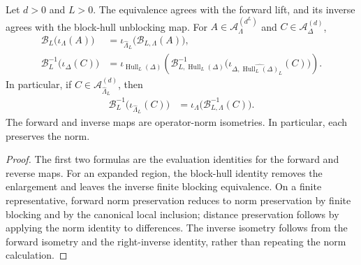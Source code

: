 \begin{lemma}
    \label{lem:qca_algebraic_blocking_formulas}
    \leanok
    Let $d>0$ and $L>0$.  The equivalence agrees with the forward lift, and
    its inverse agrees with the block-hull unblocking map.  For
    $A\in\mathcal A^{(d^L)}_\Lambda$ and
    $C\in\mathcal A^{(d)}_\Delta$,
    \begin{align}
        \mathcal B_L\bigl(\iota_\Lambda(A)\bigr)
         & =\iota_{\widehat\Lambda_L}
        \bigl(\mathcal B_{L,\Lambda}(A)\bigr),    \\
        \mathcal B_L^{-1}\bigl(\iota_\Delta(C)\bigr)
         & =\iota_{\operatorname{Hull}_L(\Delta)}
        \left(\mathcal B^{-1}_{L,\operatorname{Hull}_L(\Delta)}
        \bigl(\iota_{\Delta,
                    \widehat{\operatorname{Hull}_L(\Delta)}_L}(C)\bigr)\right).
    \end{align}
    In particular, if $C\in\mathcal A^{(d)}_{\widehat\Lambda_L}$, then
    \begin{align}
        \mathcal B_L^{-1}\bigl(\iota_{\widehat\Lambda_L}(C)\bigr)
         & =\iota_\Lambda\bigl(\mathcal B_{L,\Lambda}^{-1}(C)\bigr).
    \end{align}
    The forward and inverse maps are operator-norm isometries.  In particular,
    each preserves the norm.
\end{lemma}

\begin{proof}\leanok
    The first two formulas are the evaluation identities for the forward and
    reverse maps.  For an expanded region, the block-hull identity removes the
    enlargement and leaves the inverse finite blocking equivalence.  On a
    finite representative, forward norm preservation reduces to norm
    preservation by finite blocking and by the canonical local inclusion;
    distance preservation follows by applying the norm identity to
    differences.  The inverse isometry follows from the forward isometry and
    the right-inverse identity, rather than repeating the norm calculation.
\end{proof}

